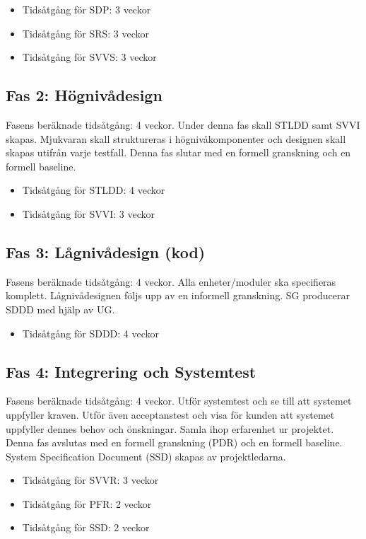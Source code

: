 \documentclass[a4paper]{article}
\begin{document}
\begin{itemize}
\item{Tidsåtgång för SDP: 3 veckor}
\item{Tidsåtgång för SRS: 3 veckor}
\item{Tidsåtgång för SVVS: 3 veckor}
\end{itemize}

\subsection{Fas 2: Högnivådesign}
Fasens beräknade tidsåtgång: 4 veckor.\newline
Under denna fas skall STLDD samt SVVI skapas. Mjukvaran skall struktureras i högnivåkomponenter och designen skall skapas utifrån varje testfall. Denna fas slutar med en formell granskning och en formell baseline.

\begin{itemize}
\item{Tidsåtgång för STLDD: 4 veckor}
\item{Tidsåtgång för SVVI: 3 veckor}
\end{itemize}

\subsection{Fas 3: Lågnivådesign (kod)}
Fasens beräknade tidsåtgång: 4 veckor.\newline
Alla enheter/moduler ska specifieras komplett. Lågnivådesignen följs upp av en informell granskning. SG producerar SDDD med hjälp av UG.
\begin{itemize}
\item{Tidsåtgång för SDDD: 4 veckor}
\end{itemize}

\subsection{Fas 4: Integrering och Systemtest}
Fasens beräknade tidsåtgång: 4 veckor.\newline
Utför systemtest och se till att systemet uppfyller kraven. Utför även acceptanstest och visa för kunden att systemet uppfyller dennes behov och önskningar. Samla ihop erfarenhet ur projektet. Denna fas avslutas med en formell granskning (PDR) och en formell baseline. System Specification Document (SSD) skapas av projektledarna.
\begin{itemize}
\item{Tidsåtgång för SVVR: 3 veckor}
\item{Tidsåtgång för PFR: 2 veckor}
\item{Tidsåtgång för SSD: 2 veckor}
\end{itemize}
\end{document}
